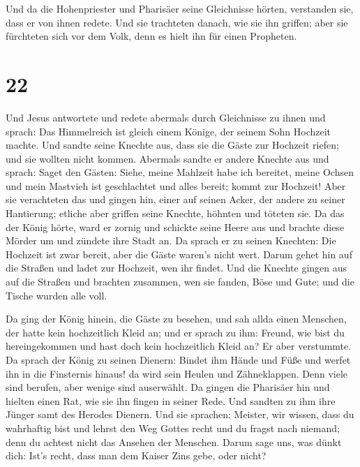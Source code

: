  Und da die Hohenpriester und Pharisäer seine Gleichnisse
hörten, verstanden sie, dass er von ihnen redete.  Und
sie trachteten danach, wie sie ihn griffen; aber sie fürchteten sich vor
dem Volk, denn es hielt ihn für einen Propheten.

\hypertarget{section-21}{%
\section{22}\label{section-21}}

 Und Jesus antwortete und redete abermals durch
Gleichnisse zu ihnen und sprach:  Das Himmelreich ist
gleich einem Könige, der seinem Sohn Hochzeit machte.  Und
sandte seine Knechte aus, dass sie die Gäste zur Hochzeit riefen; und
sie wollten nicht kommen.  Abermals sandte er andere
Knechte aus und sprach: Saget den Gästen: Siehe, meine Mahlzeit habe ich
bereitet, meine Ochsen und mein Mastvieh ist geschlachtet und alles
bereit; kommt zur Hochzeit!  Aber sie verachteten das und
gingen hin, einer auf seinen Acker, der andere zu seiner Hantierung;
 etliche aber griffen seine Knechte, höhnten und töteten
sie.  Da das der König hörte, ward er zornig und schickte
seine Heere aus und brachte diese Mörder um und zündete ihre Stadt an.
 Da sprach er zu seinen Knechten: Die Hochzeit ist zwar
bereit, aber die Gäste waren's nicht wert.  Darum gehet
hin auf die Straßen und ladet zur Hochzeit, wen ihr findet.
 Und die Knechte gingen aus auf die Straßen und brachten
zusammen, wen sie fanden, Böse und Gute; und die Tische wurden alle
voll.

 Da ging der König hinein, die Gäste zu besehen, und sah
allda einen Menschen, der hatte kein hochzeitlich Kleid an;
 und er sprach zu ihm: Freund, wie bist du hereingekommen
und hast doch kein hochzeitlich Kleid an? Er aber verstummte.
 Da sprach der König zu seinen Dienern: Bindet ihm Hände
und Füße und werfet ihn in die Finsternis hinaus! da wird sein Heulen
und Zähneklappen.  Denn viele sind berufen, aber wenige
sind auserwählt.  Da gingen die Pharisäer hin und hielten
einen Rat, wie sie ihn fingen in seiner Rede.  Und
sandten zu ihm ihre Jünger samt des Herodes Dienern. Und sie sprachen:
Meister, wir wissen, dass du wahrhaftig bist und lehrst den Weg Gottes
recht und du fragst nach niemand; denn du achtest nicht das Ansehen der
Menschen.  Darum sage uns, was dünkt dich: Ist's recht,
dass man dem Kaiser Zins gebe, oder nicht?

